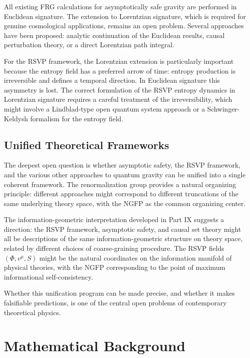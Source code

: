 \documentclass[12pt,a4paper,oneside]{book}
\theoremstyle{definition}
\theoremstyle{plain}
\theoremstyle{remark}
\begin{document}
All existing FRG calculations for asymptotically safe gravity are performed
in Euclidean signature. The extension to Lorentzian signature, which is
required for genuine cosmological applications, remains an open problem.
Several approaches have been proposed: analytic continuation of the Euclidean
results, causal perturbation theory, or a direct Lorentzian path integral.

For the RSVP framework, the Lorentzian extension is particularly important
because the entropy field has a preferred arrow of time: entropy production
is irreversible and defines a temporal direction. In Euclidean signature this
asymmetry is lost. The correct formulation of the RSVP entropy dynamics in
Lorentzian signature requires a careful treatment of the irreversibility, which
might involve a Lindblad-type open quantum system approach or a
Schwinger-Keldysh formalism for the entropy field.

\section{Unified Theoretical Frameworks}

The deepest open question is whether asymptotic safety, the RSVP framework,
and the various other approaches to quantum gravity can be unified into a
single coherent framework. The renormalization group provides a natural
organizing principle: different approaches might correspond to different
truncations of the same underlying theory space, with the NGFP as the
common organizing center.

The information-geometric interpretation developed in Part IX suggests a
direction: the RSVP framework, asymptotic safety, and causal set theory
might all be descriptions of the same information-geometric structure on
theory space, related by different choices of coarse-graining procedure.
The RSVP fields $(\Phi, v^\mu, S)$ might be the natural coordinates on the
information manifold of physical theories, with the NGFP corresponding to
the point of maximum informational self-consistency.

Whether this unification program can be made precise, and whether it makes
falsifiable predictions, is one of the central open problems of contemporary
theoretical physics.

\appendix

\chapter{Mathematical Background}
\end{document}
